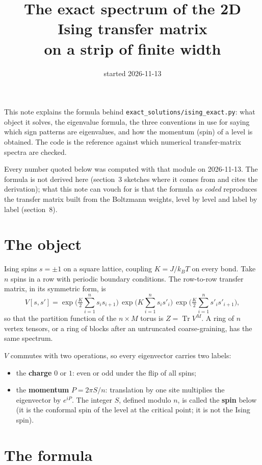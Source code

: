 \documentclass[11pt]{article}
\title{The exact spectrum of the 2D Ising transfer matrix\\ on a strip of finite width}
\author{}\date{started 2026-11-13}
\newcommand\code[1]{\texttt{#1}}
\DeclareMathOperator{\Tr}{Tr}
\begin{document}
\maketitle

This note explains the formula behind \code{exact\_solutions/ising\_exact.py}: what object it
solves, the eigenvalue formula, the three conventions in use for saying which sign patterns are
eigenvalues, and how the momentum (spin) of a level is obtained.  The code is the reference
against which numerical transfer-matrix spectra are checked.

Every number quoted below was computed with that module on 2026-11-13.  The formula is not
derived here (section~3 sketches where it comes from and cites the derivation); what this note
can vouch for is that the formula \emph{as coded} reproduces the transfer matrix built from the
Boltzmann weights, level by level and label by label (section~8).

\section{The object}

Ising spins $s = \pm 1$ on a square lattice, coupling $K = J / k_B T$ on every bond.  Take $n$
spins in a row with periodic boundary conditions.  The row-to-row transfer matrix, in its
symmetric form, is
\begin{equation}
V[s, s'] = \exp\Big(\tfrac{K}{2} \sum_{i=1}^{n} s_i s_{i+1}\Big)\,
           \exp\Big(K \sum_{i=1}^{n} s_i s'_i\Big)\,
           \exp\Big(\tfrac{K}{2} \sum_{i=1}^{n} s'_i s'_{i+1}\Big),
\end{equation}
so that the partition function of the $n \times M$ torus is $Z = \Tr V^M$.  A ring of $n$
vertex tensors, or a ring of blocks after an untruncated coarse-graining, has the same spectrum.

$V$ commutes with two operations, so every eigenvector carries two labels:
\begin{itemize}
\item the \textbf{charge} $0$ or $1$: even or odd under the flip of all spins;
\item the \textbf{momentum} $P = 2\pi S / n$: translation by one site multiplies the eigenvector
  by $e^{iP}$.  The integer $S$, defined modulo $n$, is called the \textbf{spin} below (it is the
  conformal spin of the level at the critical point; it is not the Ising spin).
\end{itemize}

\section{The formula}
\end{document}
